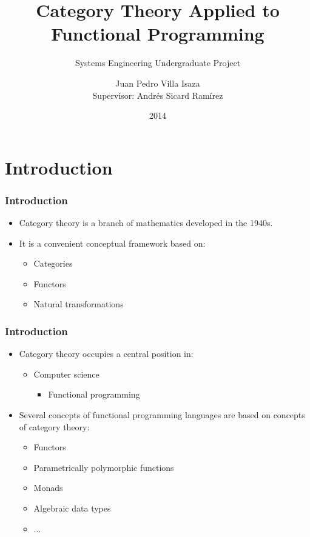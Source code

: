 \documentclass{beamer}
\title{Category Theory Applied to Functional Programming}
\subtitle{Systems Engineering Undergraduate Project}
\author[Juan Pedro Villa Isaza]{Juan Pedro Villa Isaza\\
  Supervisor: Andrés Sicard Ramírez}
\institute{EAFIT University}
\date{2014}
\begin{document}
\frame{\titlepage}



\section{Introduction}


\begin{frame}[label={introduction}]
  \frametitle{Introduction}

  \begin{itemize}
  \item
    Category theory is a branch of mathematics developed in the 1940s.
  \item
    It is a convenient conceptual framework based on:
    \begin{itemize}
    \item
      Categories
    \item
      Functors
    \item
      Natural transformations
    \end{itemize}
  \end{itemize}

\end{frame}


\begin{frame}
  \frametitle{Introduction}

  \begin{itemize}
  \item
    Category theory occupies a central position in:
    \begin{itemize}
    \item
      Computer science
      \begin{itemize}
      \item
        Functional programming
      \end{itemize}
    \end{itemize}
  \item
    Several concepts of functional programming languages are based on
    concepts of category theory:
    \begin{itemize}
    \item
      Functors
    \item
      Parametrically polymorphic functions
    \item
      Monads
    \item
      Algebraic data types
    \item
      ...
    \end{itemize}
  \end{itemize}

\end{frame}
\end{document}
